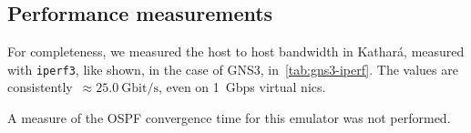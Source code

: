 \subsection{Performance measurements}

For completeness, we measured the host to host bandwidth in Kathará, measured with \texttt{iperf3}, like shown, in the case of GNS3, in~\ref{tab:gns3-iperf}.
The values are consistently~$\approx 25.0~\mbox{Gbit/s}$, even on 1~Gbps virtual \glspl{nic}.

A measure of the OSPF convergence time for this emulator was not performed.

